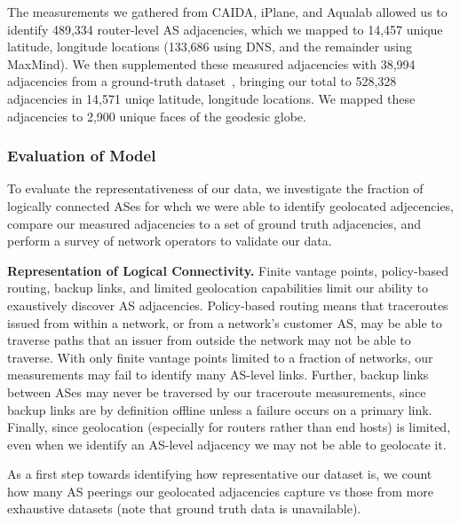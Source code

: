     The measurements we gathered from CAIDA, iPlane, and Aqualab allowed us to identify 489,334 router-level AS adjacencies, which we mapped to 14,457 unique latitude, longitude locations (133,686 using DNS, and the remainder using MaxMind).
    We then supplemented these measured adjacencies with 38,994 adjacencies from a ground-truth dataset~\cite{ixps-mapped}, bringing our total to 528,328 adjacencies in 14,571 uniqe latitude, longitude locations. 
    We mapped these adjacencies to 2,900 unique faces of the geodesic globe.   

 
        \subsubsection*{Evaluation of Model}

            To evaluate the representativeness of our data, we investigate the fraction of logically connected ASes for whch we were able to identify geolocated adjecencies, compare our measured adjacencies to a set of ground truth adjacencies, and perform a survey of network operators to validate our data.

            {\bf Representation of Logical Connectivity.} 
            Finite vantage points, policy-based routing, backup links, and limited geolocation capabilities limit our ability to exaustively discover AS adjacencies. 
            Policy-based routing means that traceroutes issued from within a network, or from a network's customer AS, may be able to traverse paths that an issuer from outside the network may not be able to traverse.
            With only finite vantage points limited to a fraction of networks, our measurements may fail to identify many AS-level links.
            Further, backup links between ASes may never be traversed by our traceroute measurements, since backup links are by definition offline unless a failure occurs on a primary link.
            Finally, since geolocation (especially for routers rather than end hosts) is limited, even when we identify an AS-level adjacency we may not be able to geolocate it.
            
            As a first step towards identifying how representative our dataset is, we count how many AS peerings our geolocated adjacencies capture vs those from more exhaustive datasets (note that ground truth data is unavailable).

